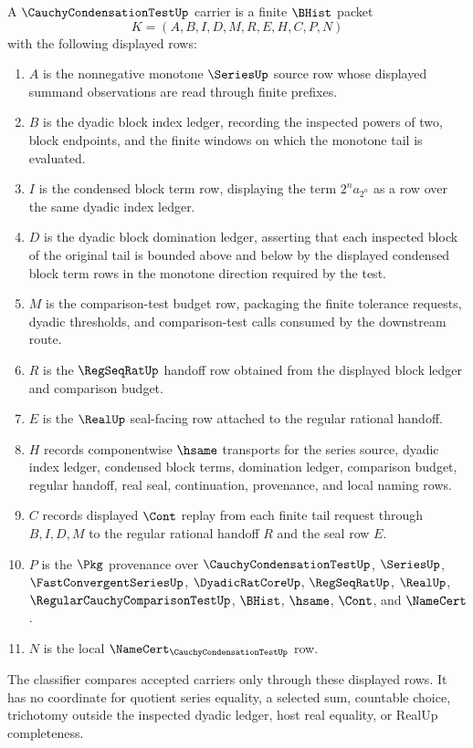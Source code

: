 \begin{definition}
\label{def:cauchy-condensation-test-carrier}
A $\CauchyCondensationTestUp$ carrier is a finite $\BHist$ packet
$$
K=(A,B,I,D,M,R,E,H,C,P,N)
$$
with the following displayed rows:
\begin{enumerate}
\item $A$ is the nonnegative monotone $\SeriesUp$ source row whose displayed summand observations are read through finite prefixes.
\item $B$ is the dyadic block index ledger, recording the inspected powers of two, block endpoints, and the finite windows on which the monotone tail is evaluated.
\item $I$ is the condensed block term row, displaying the term $2^n a_{2^n}$ as a row over the same dyadic index ledger.
\item $D$ is the dyadic block domination ledger, asserting that each inspected block of the original tail is bounded above and below by the displayed condensed block term rows in the monotone direction required by the test.
\item $M$ is the comparison-test budget row, packaging the finite tolerance requests, dyadic thresholds, and comparison-test calls consumed by the downstream route.
\item $R$ is the $\RegSeqRatUp$ handoff row obtained from the displayed block ledger and comparison budget.
\item $E$ is the $\RealUp$ seal-facing row attached to the regular rational handoff.
\item $H$ records componentwise $\hsame$ transports for the series source, dyadic index ledger, condensed block terms, domination ledger, comparison budget, regular handoff, real seal, continuation, provenance, and local naming rows.
\item $C$ records displayed $\Cont$ replay from each finite tail request through $B,I,D,M$ to the regular rational handoff $R$ and the seal row $E$.
\item $P$ is the $\Pkg$ provenance over $\CauchyCondensationTestUp$, $\SeriesUp$, $\FastConvergentSeriesUp$, $\DyadicRatCoreUp$, $\RegSeqRatUp$, $\RealUp$, $\RegularCauchyComparisonTestUp$, $\BHist$, $\hsame$, $\Cont$, and $\NameCert$.
\item $N$ is the local $\NameCert_{\CauchyCondensationTestUp}$ row.
\end{enumerate}
The classifier compares accepted carriers only through these displayed rows. It has no coordinate for quotient series equality, a selected sum, countable choice, trichotomy outside the inspected dyadic ledger, host real equality, or RealUp completeness.
\end{definition}

